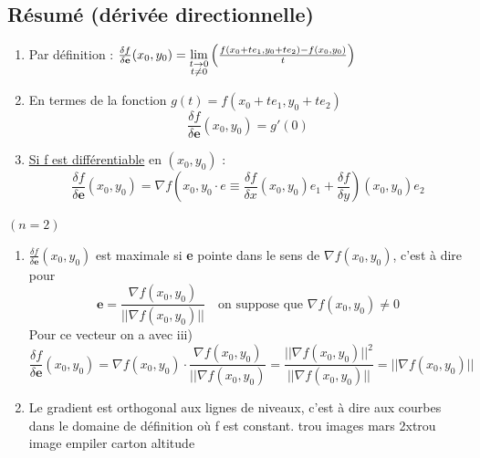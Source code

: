 \documentclass[12pt,a4paper]{article}
\begin{document}
\subsection*{Résumé (dérivée directionnelle)}
\begin{enumerate}
	\item 	Par définition : $\frac{\delta f}{\delta \textbf{e}}(x_0,y_0) = \lim\limits_{\substack{t\to 0 \\ t\neq 0}}\left(\frac{f(x_0+te_1,y_0+te_2) - f(x_0,y_0)}{t}\right)$
	\item 	En termes de la fonction $g(t) = f(x_0+te_1,y_0+te_2)$ \\
			\begin{equation*}
			\frac{\delta f}{\delta \textbf{e}}(x_0,y_0) = g'(0)
			\end{equation*}
	\item 	\uline{Si f est différentiable} en $(x_0,y_0)$ :
			\begin{equation*}
				\frac{\delta f}{\delta \textbf{e}}(x_0,y_0) = \nabla f(x_0,y_0 \cdot e \equiv \frac{\delta f}{\delta x}(x_0,y_0) e_1 + \frac{\delta f}{\delta y})(x_0,y_0) e_2
			\end{equation*}
\end{enumerate}
 $(n=2)$
\begin{enumerate}
	\item 	$\frac{\delta f}{\delta \textbf{e}}(x_0,y_0)$ est maximale si \textbf{e} pointe dans le sens de $\nabla f(x_0,y_0)$, c'est à dire pour 
			\begin{equation*}
				\textbf{e} = \frac{\nabla f(x_0,y_0)}{||\nabla f(x_0,y_0)||} \quad \text{on suppose que } \nabla f(x_0,y_0) \neq 0
			\end{equation*}
			Pour ce vecteur on a avec iii)
			\begin{equation*}
				\frac{\delta f}{\delta \textbf{e}}(x_0,y_0) = \nabla f(x_0,y_0) \cdot \frac{\nabla f(x_0,y_0)}{||\nabla f(x_0,y_0)} = \frac{||\nabla f(x_0,y_0)||^2}{||\nabla f(x_0,y_0)||} = ||\nabla f(x_0,y_0)||
			\end{equation*}
	\item 	Le gradient est orthogonal aux lignes de niveaux, c'est à dire aux courbes dans le domaine de définition où f est constant.
			{trou images mars 2x}{trou image empiler carton altitude}\\
\end{enumerate}
\end{document}
